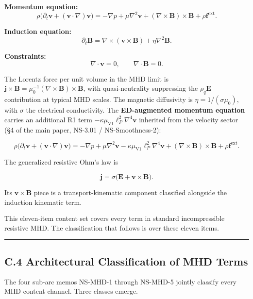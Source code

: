 \documentclass[
]{article}
\begin{document}
\textbf{Momentum equation:}
\[\rho\bigl(\partial_t\mathbf{v} + (\mathbf{v}\cdot\nabla)\mathbf{v}\bigr) = -\nabla p + \mu\nabla^2\mathbf{v} + (\nabla\times\mathbf{B})\times\mathbf{B} + \rho\mathbf{f}^\mathrm{ext}.\]

\textbf{Induction equation:}
\[\partial_t\mathbf{B} = \nabla\times(\mathbf{v}\times\mathbf{B}) + \eta\nabla^2\mathbf{B}.\]

\textbf{Constraints:}
\[\nabla\cdot\mathbf{v} = 0, \qquad \nabla\cdot\mathbf{B} = 0.\]

The Lorentz force per unit volume in the MHD limit is
\(\mathbf{j}\times\mathbf{B} = \mu_0^{-1}(\nabla\times\mathbf{B})\times\mathbf{B}\),
with quasi-neutrality suppressing the \(\rho_q\mathbf{E}\) contribution
at typical MHD scales. The magnetic diffusivity is
\(\eta = 1/(\sigma\mu_0)\), with \(\sigma\) the electrical conductivity.
The \textbf{ED-augmented momentum equation} carries an additional R1
term \(-\kappa\mu_\mathrm{V1}\ell_P^2\nabla^4\mathbf{v}\) inherited from
the velocity sector (§4 of the main paper, NS-3.01 / NS-Smoothness-2):

\[\rho\bigl(\partial_t\mathbf{v} + (\mathbf{v}\cdot\nabla)\mathbf{v}\bigr) = -\nabla p + \mu\nabla^2\mathbf{v} - \kappa\mu_\mathrm{V1}\ell_P^2\nabla^4\mathbf{v} + (\nabla\times\mathbf{B})\times\mathbf{B} + \rho\mathbf{f}^\mathrm{ext}.\]

The generalized resistive Ohm's law is

\[\mathbf{j} = \sigma\bigl(\mathbf{E} + \mathbf{v}\times\mathbf{B}\bigr).\]

Its \(\mathbf{v}\times\mathbf{B}\) piece is a transport-kinematic
component classified alongside the induction kinematic term.

This eleven-item content set covers every term in standard
incompressible resistive MHD. The classification that follows is over
these eleven items.

\begin{center}\rule{0.5\linewidth}{0.5pt}\end{center}

\subsection{C.4 Architectural Classification of MHD
Terms}\label{c.4-architectural-classification-of-mhd-terms}

The four sub-arc memos NS-MHD-1 through NS-MHD-5 jointly classify every
MHD content channel. Three classes emerge.
\end{document}
